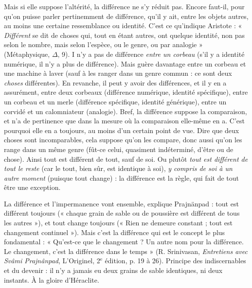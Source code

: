 Mais si elle suppose l’altérité, la différence ne s’y réduit pas. Encore faut-il,
pour qu’on puisse parler pertinemment de différence, qu’il y ait, entre les
objets autres, au moins une certaine ressemblance ou identité. C’est ce
qu’indique Aristote : « {\it Différent} se dit de choses qui, tout en étant autres, ont
quelque identité, non pas selon le nombre, mais selon l’espèce, ou le genre, ou
par analogie » ({\it }Métaphysique, $\Delta$, 9). I n’y a pas de différence {\it entre un corbeau}
(s’il y a identité numérique, il n’y a plus de différence). Mais guère davantage
entre un corbeau et une machine à laver (sauf à les ranger dans un genre
commun : ce sont deux {\it choses} différentes). En revanche, il peut y avoir des différences,
et il y en a assurément, entre deux corbeaux (différence numérique,
identité spécifique), entre un corbeau et un merle (différence spécifique, identité
générique), entre un corvidé et un calomniateur (analogie). Bref, la différence
suppose la comparaison, et n’a de pertinence que dans la mesure où la
comparaison elle-même en a. C’est pourquoi elle en a toujours, au moins d’un
certain point de vue. Dire que deux choses sont incomparables, cela suppose
qu’on les compare, donc aussi qu’on les range dans un même genre (fût-ce
celui, quasiment indéterminé, d’être ou de chose). Ainsi tout est différent de
tout, sauf de soi. Ou plutôt {\it tout est différent de tout le reste} (car le tout, bien sûr,
est identique à soi), {\it y compris de soi à un autre moment} (puisque tout change) :
la différence est la règle, qui fait de tout être une exception.

La différence et l’impermanence vont ensemble, explique Prajnänpad : tout
est différent toujours (« chaque grain de sable ou de poussière est différent de
tous les autres »), et tout change toujours (« Rien ne demeure constant ; tout
est changement continuel »). Mais c’est la différence qui est le concept le plus
fondamental : « Qu'est-ce que le changement ? Un autre nom pour la différence.
Le changement, c’est la différence dans le temps » (R. Srinivasan, {\it Entretiens
avec Svâmi Prajnânpad}, L'Originel, 2$^\text{e}$ édition, p. 19 à 26). Principe des
indiscernables et du devenir : il n’y a jamais eu deux grains de sable identiques,
ni deux instants. À la gloire d’Héraclite.


